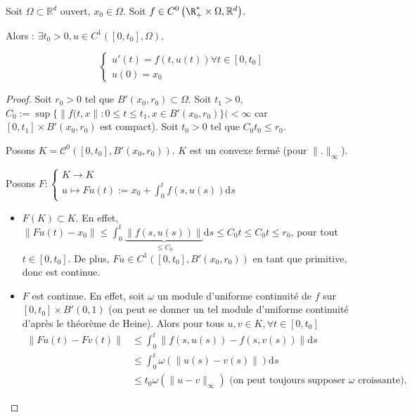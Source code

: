 \begin{theoreme}

	Soit $\Omega \subset \mathbb{R}^d $ ouvert, $x_0 \in  \Omega$.
	Soit $ f \in C^0\left( \R_+^* \times  \Omega, \mathbb{R}^d  \right) $. 
 
        Alors : $\exists  t_0 >0, u \in C^1\left( [0,t_0], \Omega \right),$
        
        $$\begin{cases}
            u'(t) = f(t,u(t)) \forall t \in [0,t_0]\\
            u(0) = x_0
        \end{cases}$$
        
\end{theoreme}
\begin{proof}
	Soit $r_0 >0$ tel que $B'\left( x_0, r_0 \right) \subset \Omega$.
	Soit $t_1 >0$, $C_0 := \sup \{\|f(t,x\| : 0\le t\le t_1, x \in B'\left( x_0, r_0 \right) \} (< \infty$ car $[0,t_1]\times B'(x_0,r_0)$ est compact).
	Soit $t_0 >0$ tel que $C_0 t_0 \le r_0.$

	Posons $K= \mathcal{C}^0([0,t_0], B'( x_0, r_0 ))$. $K$ est un convexe fermé (pour $\| . \|_\infty$).

	Posons $F : \begin{cases}
	    K \to  K \\
            u \mapsto Fu ( t ) := x_0  + \int_{0}^{t} f\left( s,u\left( s \right)  \right) \mathrm{d} s
	\end{cases}$
	\begin{itemize}
		\item $F\left( K \right) \subset K$. En effet, $\|Fu\left( t \right) -x_0\| \le \int_{0}^{t} \underbrace{\|f\left( s,u\left( s \right)  \right) \|}_{\le C_0} \mathrm{d} s \le C_0 t \le C_0t \le r_0$, pour tout $t\in [0, t_0]$.
			De plus, $Fu \in C^1( [0, t_0], B'(x_0,r_0) ) $ en tant que primitive, donc est continue.

		\item $F$ est continue.
			En effet, soit $\omega$ un module d'uniforme continuité de $f$ sur $[0,t_0] \times B'\left( 0,1 \right) $ (on peut se donner un tel module d'uniforme continuité d'après le théorème de Heine).
			Alors pour tous $u,v \in K, \forall t \in [0,t_0] \ $ 
			\begin{align*}
				\left\|Fu\left( t \right) - Fv\left( t \right) \right\| &\le \int_{0}^{t}  \|f(s,u\left( s \right) ) - f\left( s, v\left( s \right)  \right) \|   \mathrm{d} s\\
											&\le \int_{0}^{t} \omega\left( \| u\left( s \right) - v\left( s \right) \| \right) \mathrm{d} s\\
											&\le t_0 \omega\left( \|u-v\|_{\infty} \right) \text{ (on peut toujours supposer $\omega$ croissante)} 
			.\end{align*}


\end{itemize}
\end{proof}
